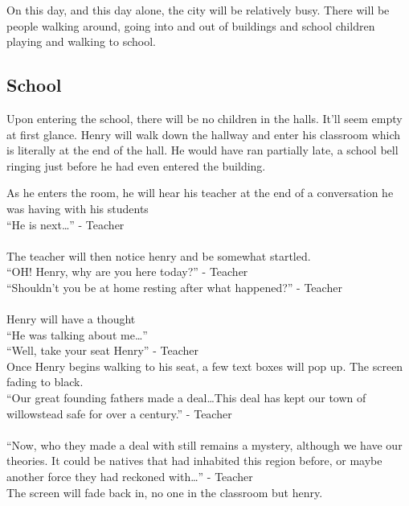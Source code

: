 \documentclass[12pt, a4paper, titlepage]{article}
\begin{document}
            On this day, and this day alone, the city will be relatively busy. There will be people walking around, going into and out of buildings and school children
            playing and walking to school.

        \subsection{School}

            Upon entering the school, there will be no children in the halls. It'll seem empty at first glance. Henry will walk down the hallway and enter 
            his classroom which is literally at the end of the hall. He would have ran partially late, a school bell ringing just before he had even entered the building.
            
            As he enters the room, he will hear his teacher at the end of a conversation he was having with his students\\
            
            ``He is next\ldots'' - Teacher\\~\\
            The teacher will then notice henry and be somewhat startled.\\
            ``OH! Henry, why are you here today?'' - Teacher\\
            ``Shouldn't you be at home resting after what happened?'' - Teacher\\~\\
            Henry will have a thought\\
            ``He was talking about me\ldots''\\
            ``Well, take your seat Henry'' - Teacher\\
            Once Henry begins walking to his seat, a few text boxes will pop up. The screen fading to black.\\
            ``Our great founding fathers made a deal\ldots This deal has kept our town of willowstead safe for over a century.'' - Teacher\\~\\
            
            ``Now, who they made a deal with still remains a mystery, although we have our theories. It could be natives that had inhabited this region before, or maybe another force they had reckoned with\ldots'' - Teacher\\
            
            The screen will fade back in, no one in the classroom but henry. 
            
\end{document}
